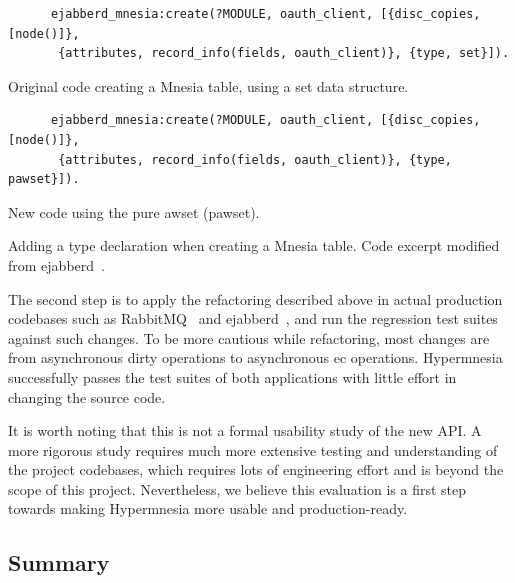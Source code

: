 \begin{listing}[htp]
  \centering 
  \begin{sublisting}[t]{\columnwidth}
    \centering
    \begin{verbatim}
      ejabberd_mnesia:create(?MODULE, oauth_client, [{disc_copies, [node()]},
       {attributes, record_info(fields, oauth_client)}, {type, set}]).
    \end{verbatim}
    \caption{Original code creating a Mnesia table, using a set data structure.}
  \end{sublisting}
  
  \begin{sublisting}[t]{\columnwidth}
    \centering
    \begin{verbatim}
      ejabberd_mnesia:create(?MODULE, oauth_client, [{disc_copies, [node()]},
       {attributes, record_info(fields, oauth_client)}, {type, pawset}]).
    \end{verbatim}
    \caption{New code using the pure \acrshort{awset} (pawset).}
  \end{sublisting} 
  \caption{Adding a type declaration when creating a Mnesia table. Code excerpt
  modified from ejabberd~\cite{processone2023ejabberd}.}
  \label{lst:hypermnesia type decl}
\end{listing}

The second step is to apply the refactoring described above in actual production
codebases such as RabbitMQ~\cite{vmware2023rabbitmq} and 
ejabberd~\cite{processone2023ejabberd}, and run the regression test suites against
such changes. To be more cautious while refactoring, most changes
are from asynchronous dirty operations to asynchronous \acrshort{ec} operations. 
Hypermnesia successfully passes the test suites of both applications with little
effort in changing the source code.

It is worth noting that this is not a formal usability study of the new API.
A more rigorous study requires much more extensive testing and understanding
of the project codebases, which requires lots of engineering effort and is beyond
the scope of this project. Nevertheless, we believe this evaluation is a first
step towards making Hypermnesia more usable and production-ready.


\subsection{Summary}


